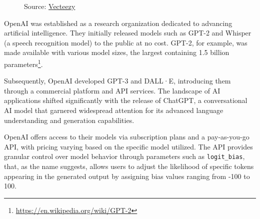 \begin{figure}
  \centering
  \def\stackalignment{r}
  {\scriptsize \parbox[t]{\linewidth}{Source: \href{https://www.vecteezy.com/png/22227364-openai-chatgpt-logo-icon}{Vecteezy}}}
\end{figure}

OpenAI was established as a research organization dedicated to advancing artificial
intelligence. They initially released models such as GPT-2\cite{Radford2019LanguageMA}
and Whisper\cite{radford2022robustspeechrecognitionlargescale} (a speech recognition
model) to the public at no cost. GPT-2, for example, was made available with various
model sizes, the largest containing 1.5 billion parameters\footnote{\url{https://en.wikipedia.org/wiki/GPT-2}}.

Subsequently, OpenAI developed GPT-3 and DALL·E\cite{ramesh2021zeroshottexttoimagegeneration},
introducing them through a commercial platform and API services. The landscape of
AI applications shifted significantly with the release of ChatGPT, a
conversational AI model that garnered widespread attention for its advanced
language understanding and generation capabilities.

OpenAI offers access to their models via subscription plans and a pay-as-you-go
API, with pricing varying based on the specific model utilized. The API provides
granular control over model behavior through parameters such as \texttt{logit\_bias},
that, as the name suggests, allows users to adjust the likelihood of specific
tokens appearing in the generated output by assigning bias values ranging from -100
to 100.

